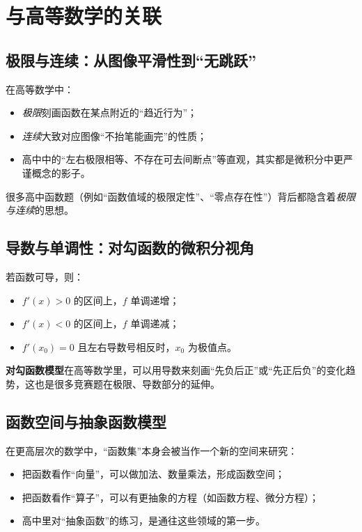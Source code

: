 \documentclass[a4paper,11pt]{ctexart}
\begin{document}
\section{与高等数学的关联}

\subsection{极限与连续：从图像平滑性到“无跳跃”}

在高等数学中：

\begin{itemize}
  \item \emph{极限}刻画函数在某点附近的“趋近行为”；
  \item \emph{连续}大致对应图像“不抬笔能画完”的性质；
  \item 高中中的“左右极限相等、不存在可去间断点”等直观，其实都是微积分中更严谨概念的影子。
\end{itemize}

很多高中函数题（例如“函数值域的极限定性”、“零点存在性”）背后都隐含着\emph{极限与连续}的思想。

\subsection{导数与单调性：对勾函数的微积分视角}

若函数可导，则：

\begin{itemize}
  \item $f'(x)>0$ 的区间上，$f$ 单调递增；
  \item $f'(x)<0$ 的区间上，$f$ 单调递减；
  \item $f'(x_0)=0$ 且左右导数号相反时，$x_0$ 为极值点。
\end{itemize}

\textbf{对勾函数模型}在高等数学里，可以用导数来刻画“先负后正”或“先正后负”的变化趋势，这也是很多竞赛题在极限、导数部分的延伸。

\subsection{函数空间与抽象函数模型}

在更高层次的数学中，“函数集”本身会被当作一个新的空间来研究：

\begin{itemize}
  \item 把函数看作“向量”，可以做加法、数量乘法，形成函数空间；
  \item 把函数看作“算子”，可以有更抽象的方程（如函数方程、微分方程）；
  \item 高中里对“抽象函数”的练习，是通往这些领域的第一步。
\end{itemize}
\end{document}

